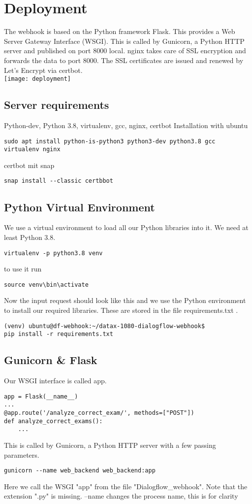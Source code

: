\author{Paul Hoffmann}
\graphicspath{ {./src/chapters/developer/media/} }

\chapter{Deployment}
The webhook is based on the Python framework Flask. This
provides a Web Server Gateway Interface (WSGI).  This is
called by Gunicorn, a Python HTTP server and published on
port 8000 local. nginx takes care of SSL encryption and
forwards the data to port 8000. The SSL certificates are
issued and renewed by Let's Encrypt via certbot.\\
\texttt{[image: deployment]}

\section{Server requirements}
Python-dev, Python 3.8, virtualenv, gcc, nginx, certbot
Installation with ubuntu
\begin{verbatim}
sudo apt install python-is-python3 python3-dev python3.8 gcc
virtualenv nginx
\end{verbatim}
certbot mit snap
\begin{verbatim}
snap install --classic certbbot
\end{verbatim}
\section{Python Virtual Environment}
We use a virtual environment to load all our Python
libraries into it. We need at least Python 3.8.
\begin{verbatim}
virtualenv -p python3.8 venv
\end{verbatim}
to use it run
\begin{verbatim}
source venv\bin\activate
\end{verbatim}
Now the input request should look like this and we use the
Python environment to install our required libraries. These
are stored in the file requirements.txt .
\begin{verbatim}
(venv) ubuntu@df-webhook:~/datax-1080-dialogflow-webhook$
pip install -r requirements.txt
\end{verbatim}

\section{Gunicorn \& Flask}
Our WSGI interface is called app.
\begin{verbatim}
app = Flask(__name__)
...
@app.route('/analyze_correct_exam/', methods=["POST"])
def analyze_correct_exams():
	...
\end{verbatim}
This is called by Gunicorn, a Python HTTP server with a few
passing parameters.
\begin{verbatim}
gunicorn --name web_backend web_backend:app
\end{verbatim}
Here we call the WSGI "app" from the file
"Dialogflow\_webhook". Note that the extension ".py" is
missing.  --name changes the process name, this is for
clarity
